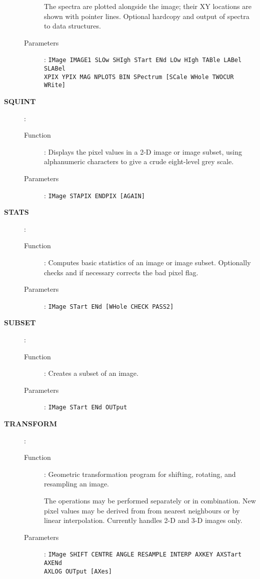 \begin{description}
\begin{description}
      The spectra are plotted alongside the image; their XY locations
      are shown with pointer lines. Optional hardcopy and output of
      spectra to data structures.  
   \item[Parameters]:
      {\tt IMage IMAGE1 SLOw SHIgh STart ENd LOw HIgh TABle LABel SLABel\\
      XPIX YPIX MAG NPLOTS BIN SPectrum [SCale WHole TWOCUR WRite]}
   \end{description}

\newpage

\item[\large\bf SQUINT]:
   \begin{description}
   \item[Function]: 
      Displays the pixel values in a 2-D image or image subset, using
      alphanumeric characters to give a crude eight-level grey scale.
   \item[Parameters]: 
      {\tt IMage STAPIX ENDPIX [AGAIN]}
   \end{description}

\item[\large\bf STATS]:
   \begin{description}
   \item[Function]: 
      Computes basic statistics of an image or image subset. Optionally
      checks and if necessary corrects the bad pixel flag.
   \item[Parameters]: 
      {\tt IMage STart ENd [WHole CHECK PASS2]}
   \end{description}

\item[\large\bf SUBSET]:
   \begin{description}
   \item[Function]: 
      Creates a subset of an image.
   \item[Parameters]: 
      {\tt IMage STart ENd OUTput}
   \end{description}

\item[\large\bf TRANSFORM]:
   \begin{description}
   \item[Function]: 
      Geometric transformation program for shifting, rotating, and
      resampling an image.

      The operations may be performed separately or in combination. New
      pixel values may be derived from from nearest neighbours or by
      linear interpolation. Currently handles 2-D and 3-D images only.
   \item[Parameters]: 
      {\tt IMage SHIFT CENTRE ANGLE RESAMPLE INTERP AXKEY AXSTart AXENd\\
      AXLOG OUTput [AXes]}
   \end{description}


\end{description}
